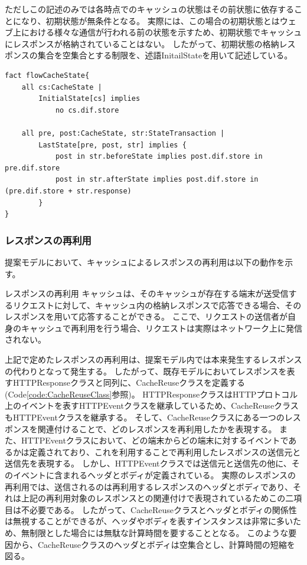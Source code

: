 \documentclass[journal]{IEEEtran}
\begin{document}
ただしこの記述のみでは各時点でのキャッシュの状態はその前状態に依存することになり、初期状態が無条件となる。
実際には、この場合の初期状態とはウェブ上における様々な通信が行われる前の状態を示すため、初期状態でキャッシュにレスポンスが格納されていることはない。
したがって、初期状態の格納レスポンスの集合を空集合とする制限を、述語InitailStateを用いて記述している。

\begin{lstlisting}[caption=レスポンスの格納と削除の表現, label=code:StoreResponse]
fact flowCacheState{
	all cs:CacheState |
		InitialState[cs] implies
			no cs.dif.store

	all pre, post:CacheState, str:StateTransaction |
		LastState[pre, post, str] implies {
			post in str.beforeState implies post.dif.store in pre.dif.store
			post in str.afterState implies post.dif.store in (pre.dif.store + str.response)
		}
}
\end{lstlisting}

\subsubsection{レスポンスの再利用}
提案モデルにおいて、キャッシュによるレスポンスの再利用は以下の動作を示す。

\begin{itembox}[l]{レスポンスの再利用}
キャッシュは、そのキャッシュが存在する端末が送受信するリクエストに対して、キャッシュ内の格納レスポンスで応答できる場合、そのレスポンスを用いて応答することができる。
ここで、リクエストの送信者が自身のキャッシュで再利用を行う場合、リクエストは実際はネットワーク上に発信されない。
\end{itembox}

上記で定めたレスポンスの再利用は、提案モデル内では本来発生するレスポンスの代わりとなって発生する。
したがって、既存モデルにおいてレスポンスを表すHTTPResponseクラスと同列に、CacheReuseクラスを定義する(Code\ref{code:CacheReuseClass}参照)。
HTTPResponseクラスはHTTPプロトコル上のイベントを表すHTTPEventクラスを継承しているため、CacheReuseクラスもHTTPEventクラスを継承する。
そして、CacheReuseクラスにある一つのレスポンスを関連付けることで、どのレスポンスを再利用したかを表現する。
また、HTTPEventクラスにおいて、どの端末からどの端末に対するイベントであるかは定義されており、これを利用することで再利用したレスポンスの送信元と送信先を表現する。
しかし、HTTPEventクラスでは送信元と送信先の他に、そのイベントに含まれるヘッダとボディが定義されている。
実際のレスポンスの再利用では、送信されるのは再利用するレスポンスのヘッダとボディであり、それは上記の再利用対象のレスポンスとの関連付けで表現されているためこの二項目は不必要である。
したがって、CacheReuseクラスとヘッダとボディの関係性は無視することができるが、ヘッダやボディを表すインスタンスは非常に多いため、無制限とした場合には無駄な計算時間を要することとなる。
このような要因から、CacheReuseクラスのヘッダとボディは空集合とし、計算時間の短縮を図る。
\end{document}

